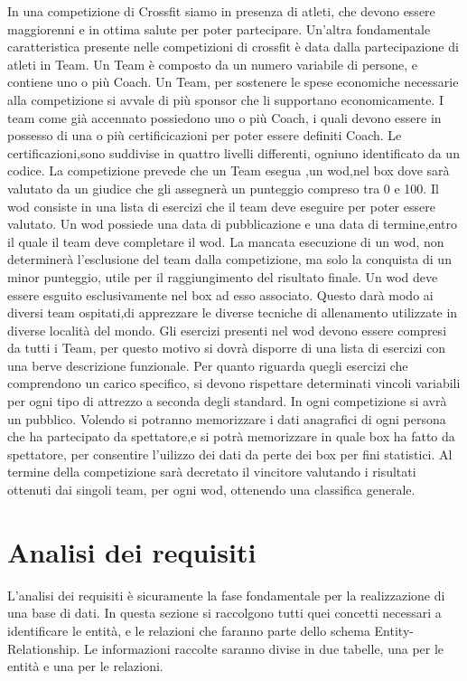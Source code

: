 \documentclass[12pt,a4paper]{article}
\begin{document}
In una competizione di Crossfit siamo in presenza di atleti, che devono essere maggiorenni e in ottima salute per poter partecipare. Un'altra fondamentale caratteristica presente nelle competizioni di crossfit è data dalla partecipazione di atleti in Team. Un Team è composto da un numero variabile di persone, e contiene uno o più Coach. Un Team, per sostenere le spese economiche necessarie alla competizione si avvale di più sponsor che li supportano economicamente. I team come già accennato possiedono uno o più Coach, i quali devono essere in possesso di una o più certificicazioni per poter essere definiti Coach. Le certificazioni,sono suddivise in quattro livelli differenti, ogniuno identificato da un codice. La competizione prevede che un Team esegua ,un wod,nel box dove sarà valutato da un giudice che gli assegnerà un punteggio compreso tra 0 e 100. Il wod consiste in una lista di esercizi che il team deve eseguire per poter essere valutato. Un wod possiede una data di pubblicazione e una data di termine,entro il quale il team deve completare il wod. La mancata esecuzione di un wod, non determinerà l'esclusione del team dalla competizione, ma solo la conquista di un minor punteggio, utile per il raggiungimento del risultato finale. Un wod deve essere esguito  esclusivamente nel box ad esso associato. Questo darà modo ai diversi team ospitati,di apprezzare le diverse tecniche di allenamento utilizzate in diverse località del mondo. Gli esercizi presenti nel wod devono essere compresi da tutti i Team, per questo motivo si dovrà disporre di una lista di esercizi con una berve descrizione funzionale. Per quanto riguarda quegli esercizi che comprendono un carico specifico, si devono rispettare determinati vincoli variabili per ogni tipo di attrezzo a seconda degli standard. In ogni competizione si avrà un pubblico. Volendo si potranno memorizzare i dati anagrafici di ogni persona che ha partecipato da spettatore,e si potrà memorizzare in quale box ha fatto da spettatore, per consentire l'uilizzo dei dati da perte dei box per fini statistici. Al termine della competizione sarà decretato il vincitore valutando i risultati ottenuti dai singoli team, per ogni wod, ottenendo una classifica generale.
\newpage
\section{Analisi dei requisiti}

L'analisi dei requisiti è sicuramente la fase fondamentale per la realizzazione di una base di dati. In questa sezione si raccolgono tutti quei concetti necessari a identificare le entità, e le relazioni che faranno parte dello schema Entity-Relationship. Le informazioni raccolte saranno divise in due tabelle, una per le entità e una per le relazioni.
\end{document}
